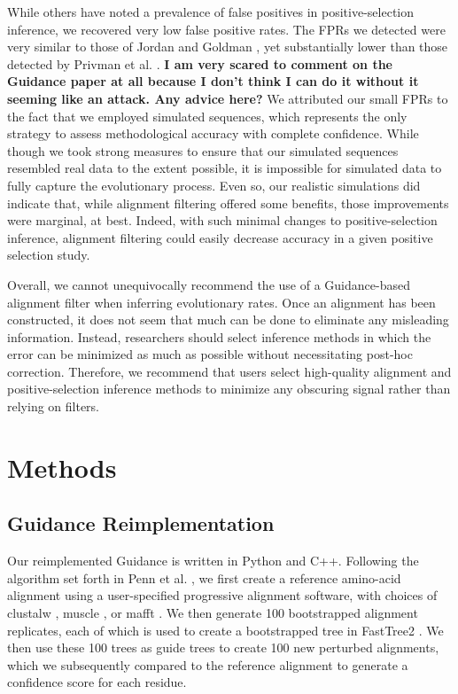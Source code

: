 \documentclass[10pt]{article}
\begin{document}
While others have noted a prevalence of false positives in positive-selection inference, we recovered very low false positive rates. The FPRs we detected were very similar to those of Jordan and Goldman \citet{Jordan2012}, yet substantially lower than those detected by Privman et al. \citet{Privman2012}. \textbf{I am very scared to comment on the Guidance paper at all because I don't think I can do it without it seeming like an attack. Any advice here?} We attributed our small FPRs to the fact that we employed simulated sequences, which represents the only strategy to assess methodological accuracy with complete confidence. While though we took strong measures to ensure that our simulated sequences resembled real data to the extent possible, it is impossible for simulated data to fully capture the evolutionary process. Even so, our realistic simulations did indicate that, while alignment filtering offered some benefits, those improvements were marginal, at best. Indeed, with such minimal changes to positive-selection inference, alignment filtering could easily decrease accuracy in a given positive selection study.  

Overall, we cannot unequivocally recommend the use of a Guidance-based alignment filter when inferring evolutionary rates. Once an alignment has been constructed, it does not seem that much can be done to eliminate any misleading information. Instead, researchers should select inference methods in which the error can be minimized as much as possible without necessitating post-hoc correction. Therefore, we recommend that users select high-quality alignment and positive-selection inference methods to minimize any obscuring signal rather than relying on filters.


\section*{Methods}

\subsection*{Guidance Reimplementation}
Our reimplemented Guidance is written in Python and C++. Following the algorithm set forth in Penn et al. \citep{Penn2010}, we first create a reference amino-acid alignment using a user-specified progressive alignment software, with choices of clustalw \citep{Thompson1994}, muscle \citep{Edgar2004}, or mafft \citep{Katoh2002, Katoh2005}. We then generate 100 bootstrapped alignment replicates, each of which is used to create a bootstrapped tree in FastTree2 \citep{Price2010}. We then use these 100 trees as guide trees to create 100 new perturbed alignments, which we subsequently compared to the reference alignment to generate a confidence score for each residue.
\end{document}
